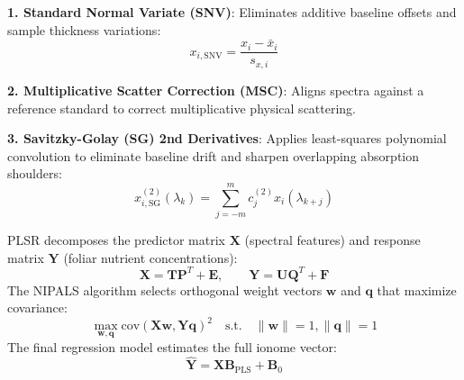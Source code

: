 \documentclass[11pt,a4paper,landscape]{article}
\begin{document}
\vspace{0.3cm}
\begin{minipage}[t]{0.48\textwidth}
\begin{tcolorbox}[colback=white,colframe=accent,title=\textbf{Mathematical Preprocessing Pipeline},arc=2mm]
\textbf{1. Standard Normal Variate (SNV)}:
Eliminates additive baseline offsets and sample thickness variations:
\begin{equation*}
    x_{i,\text{SNV}} = \frac{x_i - \bar{x}_i}{s_{x,i}}
\end{equation*}

\textbf{2. Multiplicative Scatter Correction (MSC)}:
Aligns spectra against a reference standard to correct multiplicative physical scattering.

\textbf{3. Savitzky-Golay (SG) 2nd Derivatives}:
Applies least-squares polynomial convolution to eliminate baseline drift and sharpen overlapping absorption shoulders:
\begin{equation*}
    x_{i,\text{SG}}^{(2)}(\lambda_k) = \sum_{j=-m}^m c_j^{(2)} x_i(\lambda_{k+j})
\end{equation*}
\end{tcolorbox}
\end{minipage}
\hfill
\begin{minipage}[t]{0.48\textwidth}
\begin{tcolorbox}[colback=white,colframe=primary,title=\textbf{PLSR Latent Space Formulation},arc=2mm]
PLSR decomposes the predictor matrix $\mathbf{X}$ (spectral features) and response matrix $\mathbf{Y}$ (foliar nutrient concentrations):
\begin{equation*}
    \mathbf{X} = \mathbf{TP}^T + \mathbf{E}, \qquad \mathbf{Y} = \mathbf{UQ}^T + \mathbf{F}
\end{equation*}
The NIPALS algorithm selects orthogonal weight vectors $\mathbf{w}$ and $\mathbf{q}$ that maximize covariance:
\begin{equation*}
    \max_{\mathbf{w},\mathbf{q}} \text{cov}(\mathbf{Xw}, \mathbf{Yq})^2 \quad \text{s.t.} \quad \|\mathbf{w}\| = 1, \|\mathbf{q}\| = 1
\end{equation*}
The final regression model estimates the full ionome vector:
\begin{equation*}
    \hat{\mathbf{Y}} = \mathbf{X} \mathbf{B}_{\text{PLS}} + \mathbf{B}_0
\end{equation*}
\end{tcolorbox}
\end{minipage}
\end{document}
